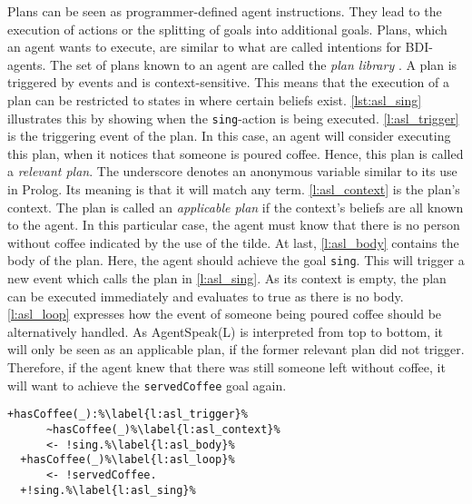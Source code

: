 Plans can be seen as programmer-defined agent instructions.
They lead to the execution of actions or the splitting of goals into additional goals.
Plans, which an agent wants to execute, are similar to what are called intentions for BDI-agents.
The set of plans known to an agent are called the \emph{plan library} \cite{bordini_jason_2005}.
A plan is triggered by events and is context-sensitive. This means that the execution of a plan can be restricted to states in where certain beliefs exist. \autoref{lst:asl_sing} illustrates this by showing when the \texttt{sing}-action is being executed. \autoref{l:asl_trigger} is the triggering event of the plan.
In this case, an agent will consider executing this plan, when it notices that someone is poured coffee. Hence, this plan is called a \emph{relevant plan}.
The underscore denotes an anonymous variable similar to its use in Prolog. Its meaning is that it will match any term. \autoref{l:asl_context} is the plan's context. The plan is called an \emph{applicable plan} if the context's beliefs are all known to the agent. In this particular case, the agent must know that there is no person without coffee indicated by the use of the tilde. At last, \autoref{l:asl_body} contains the body of the plan.
Here, the agent should achieve the goal \texttt{sing}.
This will trigger a new event which calls the plan in \autoref{l:asl_sing}.
As its context is empty, the plan can be executed immediately and evaluates to true as there is no body. \autoref{l:asl_loop} expresses how the event of someone being poured coffee should be alternatively handled.
As AgentSpeak(L) is interpreted from top to bottom, it will only be seen as an applicable plan, if the former relevant plan did not trigger.
Therefore, if the agent knew that there was still someone left without coffee, it will want to achieve the \texttt{servedCoffee} goal again.
\begin{lstlisting}[firstnumber=4, caption={Events for handling someone being poured a coffee as well as the \texttt{sing} plan.}, label=lst:asl_sing]
  +hasCoffee(_):%\label{l:asl_trigger}%
      ~hasCoffee(_)%\label{l:asl_context}%
      <- !sing.%\label{l:asl_body}%
  +hasCoffee(_)%\label{l:asl_loop}%
      <- !servedCoffee.
  +!sing.%\label{l:asl_sing}%
\end{lstlisting}
